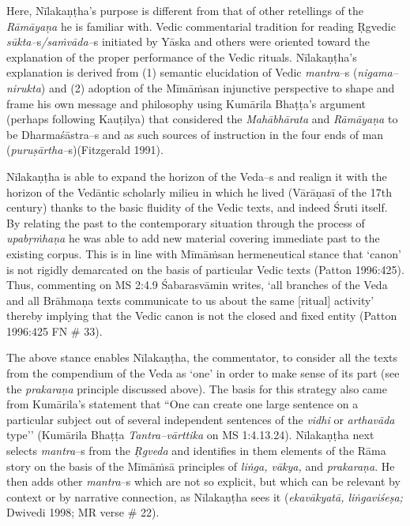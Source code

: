 Here, Nīlakaṇṭha’s purpose is different from that of other retellings of the \textit{Rāmāyaṇa} he is familiar with. Vedic commentarial tradition for reading Ṛgvedic \textit{sūkta–}s\textit{/saṁvāda–}s initiated by Yāska and others were oriented toward the explanation of the proper performance of the Vedic rituals. Nīlakaṇṭha's explanation is derived from (1) semantic elucidation of Vedic \textit{mantra}–s (\textit{nigama–nirukta}) and (2) adoption of the Mīmāṁsan injunctive perspective to shape and frame his own message and philosophy using Kumārila Bhaṭṭa’s argument (perhaps following Kauṭilya) that considered the \textit{Mahābhārata} and \textit{Rāmāyaṇa} to be Dharmaśāstra–s and as such sources of instruction in the four ends of man (\textit{puruṣārtha–}s)(Fitzgerald 1991).

Nīlakaṇṭha is able to expand the horizon of the Veda–s and realign it with the horizon of the Vedāntic scholarly milieu in which he lived (Vārāṇasī of the 17th century) thanks to the basic fluidity of the Vedic texts, and indeed Śruti itself. By relating the past to the contemporary situation through the process of \textit{upabṛṁhaṇa} he was able to add new material covering immediate past to the existing corpus. This is in line with Mīmāṁsan hermeneutical stance that ‘canon’ is not rigidly demarcated on the basis of particular Vedic texts (Patton 1996:425). Thus, commenting on MS 2:4.9 Śabarasvāmin writes, ‘all branches of the Veda and all Brāhmaṇa texts communicate to us about the same [ritual] activity’ thereby implying that the Vedic canon is not the closed and fixed entity (Patton 1996:425 FN \# 33).

The above stance enables Nīlakaṇṭha, the commentator, to consider all the texts from the compendium of the Veda as ‘one’ in order to make sense of its part (see the \textit{prakaraṇa} principle discussed above). The basis for this strategy also came from Kumārila’s statement that “One can create one large sentence on a particular subject out of several independent sentences of the \textit{vidhi} or \textit{arthavāda} type’’ (Kumārila Bhaṭṭa \textit{Tantra–vārttika} on MS 1:4.13.24). Nīlakaṇṭha next selects \textit{mantra}–s from the \textit{Ṛgveda} and identifies in them elements of the Rāma story on the basis of the Mīmāṁsā principles of \textit{liṅga, vākya,} and \textit{prakaraṇa}. He then adds other \textit{mantra}–s which are not so explicit, but which can be relevant by context or by narrative connection, as Nīlakaṇṭha sees it (\textit{ekavākyatā, liṅgaviśeṣa;} Dwivedi 1998; MR verse \# 22).

